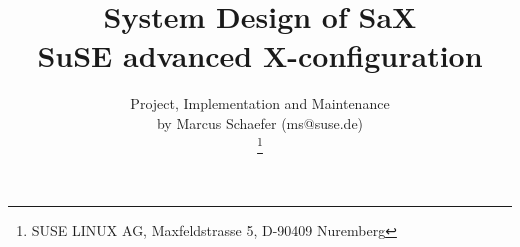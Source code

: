 \documentclass[11pt, english, a4paper, headsepline, footsepline,
BCOR1.5cm, DIV16, bigheadings, bibtotoc, idxtotoc, headinclude,
footexclude, abstracton]{scrbook}
\title{
  System Design of SaX\\
  SuSE advanced X-configuration
}
\author{
  Project, Implementation and Maintenance\\ 
  by Marcus Schaefer (ms@suse.de)\\
  \thanks{
  SUSE LINUX AG, Maxfeldstrasse 5, D-90409 Nuremberg
  }
}
\date{
 \vspace{1cm}
 \epsfig{
   file=pictures/logo.ps,width=4cm
 }\\
 \vspace{1.5cm}
 \vspace{3cm}
 \begin{tabbing}
  \hspace{2.6cm} Author: \quad\= Marcus Schaefer\\
  \hspace{2.6cm} Datum:\>  \today\\
 \end{tabbing}
}
\begin{document}
\dominitoc



\maketitle

\tableofcontents










\end{document}
